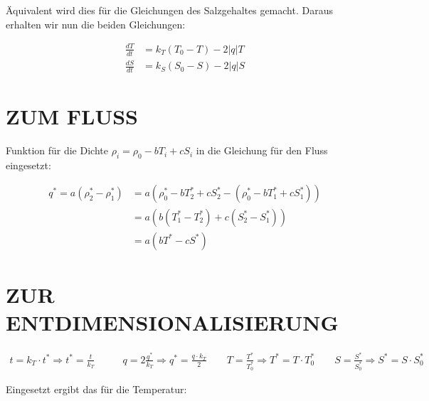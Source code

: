 \documentclass[a4paper,twoside]{article}
\begin{document}
	\noindent Äquivalent wird dies für die Gleichungen des Salzgehaltes gemacht. Daraus erhalten wir nun die beiden Gleichungen:
	\begin{footnotesize}
	\begin{align*}
		\frac{dT}{dt} &= k_T\left(T_{0} - T\right) - 2\left|q\right|T \\		
		\frac{dS}{dt} &= k_S\left(S_{0} - S\right) - 2\left|q\right|S
	\end{align*}
	\end{footnotesize}

\section*{\uppercase{Zum Fluss}\label{sec: Fluss}}

	\noindent Funktion für die Dichte \(\rho_i = \rho_0 - bT_i + cS_i\) in die Gleichung für den Fluss eingesetzt:
	\begin{footnotesize}
	\begin{align*}
		q^* = a\left( \rho^*_2 - \rho^*_1 \right) &=
		a \left( 
			\rho^*_0 - bT^*_2 + cS^*_2 -
			\left( \rho^*_0 - bT^*_1 + cS^*_1 \right)
		\right) \\
		&= a \left( b \left(T^*_1 - T^*_2\right) + c \left( S^*_2 - S^*_1 \right) \right) \\
		&= a \left( bT^* - cS^* \right)
	\end{align*}
	\end{footnotesize}
	
	\section*{\uppercase{Zur Entdimensionalisierung}\label{sec: Entdimensionierung}}	

	\begin{footnotesize}
	\begin{align*}
		t = k_T \cdot t^* \Rightarrow t^* = \frac{t}{k_T} &\qquad
		q = 2\frac{q^*}{k_T} \Rightarrow q^* = \frac{q \cdot k_T}{2} \qquad
		T = \frac{T^*}{T^*_0} \Rightarrow T^* = T \cdot T^*_0 \qquad
		S = \frac{S^*}{S^*_0} \Rightarrow S^* = S \cdot S^*_0
	\end{align*}
	\end{footnotesize}
	
	Eingesetzt ergibt das für die Temperatur:
	
\end{document}
